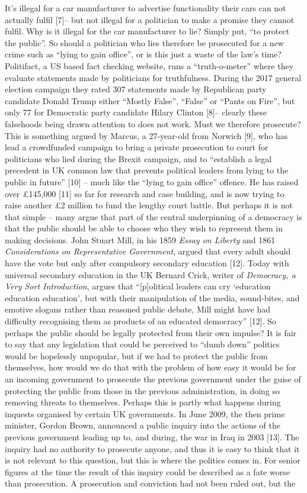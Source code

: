 \documentclass[11pt,a4paper]{report}
\begin{document}
\begin{multicols}{2}
		It’s illegal for a car manufacturer to advertise functionality their cars can not actually fulfil [7]– but not illegal for a politician to make a promise they cannot fulfil. Why is it illegal for the car manufacturer to lie? Simply put, “to protect the public”. So should a politician who lies therefore be prosecuted for a new crime such as “lying to gain office”, or is this just a waste of the law’s time? Politifact, a US based fact checking website, runs a “truth-o-meter” where they evaluate statements made by politicians for truthfulness. During the 2017 general election campaign they rated 307 statements made by Republican party candidate Donald Trump either “Mostly False”, “False” or “Pants on Fire”, but only 77 for Democratic party candidate Hilary Clinton [8]– clearly these falsehoods being drawn attention to does not work. Must we therefore prosecute? This is something argued by Marcus, a 27-year-old from Norwich [9], who has lead a crowdfunded campaign to bring a private prosecution to court for politicians who lied during the Brexit campaign, and to “establish a legal precedent in UK common law that prevents political leaders from lying to the public in future” [10] – much like the “lying to gain office” offence. He has raised over £145,000 [11] so far for research and case building, and is now trying to raise another £2 million to fund the lengthy court battle. But perhaps it is not that simple – many argue that part of the central underpinning of a democracy is that the public should be able to choose who they wish to represent them in making decisions.  John Stuart Mill, in his 1859 \textit{Essay on Liberty} and 1861 \textit{Considerations on Representative Government}, argued that every adult should have the vote but only after compulsory secondary education [12]. Today with universal secondary education in the UK Bernard Crick, writer of \textit{Democracy, a Very Sort Introduction}, argues that “[p]olitical leaders can cry ‘education education education’, but with their manipulation of the media, sound-bites, and emotive slogans rather than reasoned public debate, Mill might have had difficulty recognising them as products of an educated democracy” [12]. So perhaps the public should be legally protected from their own impulse? It is fair to say that any legislation that could be perceived to “dumb down” politics would be hopelessly unpopular, but if we had to protect the public from themselves, how would we do that with the problem of how easy it would be for an incoming government to prosecute the previous government under the guise of protecting the public from those in the previous administration, in doing so removing threats to themselves. Perhaps this is partly what happens during inquests organised by certain UK governments. In June 2009, the then prime minister, Gordon Brown, announced a public inquiry into the actions of the previous government leading up to, and during, the war in Iraq in 2003 [13]. The inquiry had no authority to prosecute anyone, and thus it is easy to think that it is not relevant to this question, but this is where the politics comes in. For senior figures at the time the result of this inquiry could be described as a fate worse than prosecution. A prosecution and conviction had not been ruled out, but the 
\end{multicols}
\end{document}
